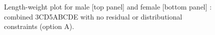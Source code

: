 \begin{figure}[htp]
\captionsetup[subfigure]{labelformat=empty}
\begin{center}
\newline
{}
\end{center}
\caption{Length-weight plot for male [top panel] and female [bottom panel] \fishname: combined 3CD5ABCDE with no residual or distributional constraints (option A).}
\label{fig:lwOptionA}
\end{figure}

